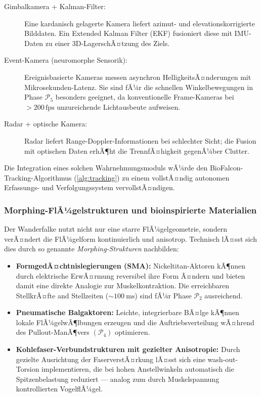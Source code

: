 ﻿\documentclass[12pt,a4paper]{article}
\theoremstyle{remark}
\begin{document}
	\begin{description}
		\item[Gimbalkamera + Kalman-Filter:] Eine kardanisch gelagerte Kamera liefert azimut- und elevationskorrigierte Bilddaten. Ein Extended Kalman Filter (EKF) fusioniert diese mit IMU-Daten zu einer 3D-LagerschÃ¤tzung des Ziels.
		\item[Event-Kamera (neuromorphe Sensorik):] Ereignisbasierte Kameras messen asynchron HelligkeitsÃ¤nderungen mit Mikrosekunden-Latenz. Sie sind fÃ¼r die schnellen Winkelbewegungen in Phase $\mathcal{P}_5$ besonders geeignet, da konventionelle Frame-Kameras bei $> 200 \, \mathrm{fps}$ unzureichende Lichtausbeute aufweisen.
		\item[Radar + optische Kamera:] Radar liefert Range-Doppler-Informationen bei schlechter Sicht; die Fusion mit optischen Daten erhÃ¶ht die TrennfÃ¤higkeit gegenÃ¼ber Clutter.
	\end{description}

	Die Integration eines solchen Wahrnehmungsmoduls wÃ¼rde den BioFalcon-Tracking-Algorithmus (\cref{alg:tracking}) zu einem vollstÃ¤ndig autonomen Erfassungs- und Verfolgungssystem vervollstÃ¤ndigen.

	\subsubsection{Morphing-FlÃ¼gelstrukturen und bioinspirierte Materialien}

	Der Wanderfalke nutzt nicht nur eine starre FlÃ¼gelgeometrie, sondern verÃ¤ndert die FlÃ¼gelform kontinuierlich und anisotrop. Technisch lÃ¤sst sich dies durch so genannte \textit{Morphing-Strukturen} nachbilden:

	\begin{itemize}
		\item \textbf{FormgedÃ¤chtnislegierungen (SMA):} Nickeltitan-Aktoren kÃ¶nnen durch elektrische ErwÃ¤rmung reversibel ihre Form Ã¤ndern und bieten damit eine direkte Analogie zur Muskelkontraktion. Die erreichbaren StellkrÃ¤fte and Stellzeiten ($\sim \SI{100}{\ms}$) sind fÃ¼r Phase $\mathcal{P}_2$ ausreichend.
		\item \textbf{Pneumatische Balgaktoren:} Leichte, integrierbare BÃ¤lge kÃ¶nnen lokale FlÃ¼gelwÃ¶lbungen erzeugen und die Auftriebsverteilung wÃ¤hrend des Pullout-ManÃ¶vers $({\mathcal{P}_4})$ optimieren.
		\item \textbf{Kohlefaser-Verbundstrukturen mit gezielter Anisotropie:} Durch gezielte Ausrichtung der FaserverstÃ¤rkung lÃ¤sst sich eine wash-out-Torsion implementieren, die bei hohen Anstellwinkeln automatisch die Spitzenbelastung reduziert --- analog zum durch Muskelspannung kontrollierten VogelflÃ¼gel.
	\end{itemize}
\end{document}
